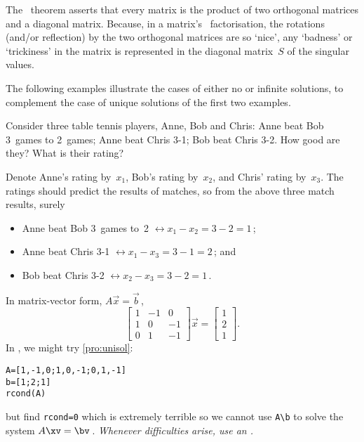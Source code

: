 The \svd\ theorem asserts that every matrix is the product of two orthogonal matrices and a diagonal matrix.  
Because, in a matrix's \svd\ factorisation, the rotations (and/or reflection) by the two orthogonal matrices are so `nice', any `badness' or `trickiness' in the matrix is represented in the diagonal matrix~\(S\) of the singular values.


\begin{aside}
The following examples illustrate the cases of either no or infinite solutions, to complement the case of unique solutions of the first two examples.
\end{aside}


\begin{example} \label{eg:rstp}
    Consider three table tennis players, Anne, Bob and Chris:
        Anne beat Bob 3~games to 2~games;
        Anne beat Chris 3-1;
        Bob beat Chris 3-2.
	How good are they?  What is their rating?  
    
\begin{solution} 
    Denote Anne's rating by~$x_1$, Bob's rating by~$x_2$, and Chris' 
    rating by~$x_3$.    
	The ratings should predict the results of matches, so from the
	above three match results, surely
	\begin{itemize}
\item Anne beat Bob 3~games to~2 \(\leftrightarrow x_1-x_2=3-2=1\)\,;
\item Anne beat Chris 3-1 \(\leftrightarrow x_1-x_3=3-1=2\)\,; and
\item Bob beat Chris 3-2 \(\leftrightarrow x_2-x_3=3-2=1\)\,.
\end{itemize}
    In matrix-vector form, $A\vec x=\vec b$\,,
    \begin{displaymath}
        \begin{bmatrix}
            1&-1&0\\ 1&0&-1\\ 0&1&-1
        \end{bmatrix}\vec x=
        \begin{bmatrix}
            1\\ 2\\ 1
        \end{bmatrix}.
    \end{displaymath}
\setbox\ajrqrbox\hbox{}%
\marginpar{\usebox{\ajrqrbox\\[2ex]}}%
In \script,  we might try \autoref{pro:unisol}:
\begin{verbatim}
A=[1,-1,0;1,0,-1;0,1,-1]
b=[1;2;1]
rcond(A)
\end{verbatim}
but find \verb|rcond=0| which is extremely terrible so we cannot use \verb|A\b| to solve the system \(A\xv=\bv\)\,.
\emph{Whenever difficulties arise, use an \svd.}


\end{solution}
\end{example}
